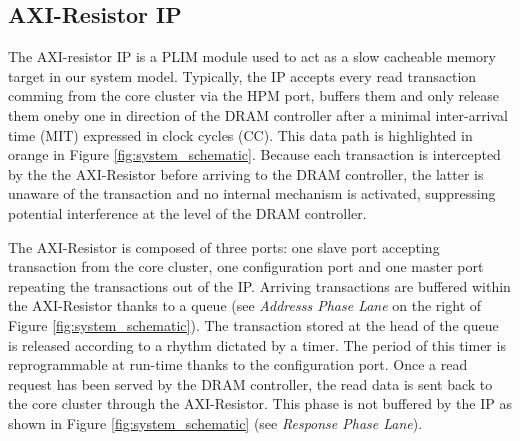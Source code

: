     \subsection{AXI-Resistor IP}
        \label{subsec:axi-resistor}
        The AXI-resistor IP is a PLIM module \cite{PLIM20} used to act as a slow cacheable memory target in our system model.
        Typically, the IP accepts every read transaction comming from the core cluster via the HPM port, buffers them and only release them oneby one in direction of the DRAM controller after a minimal inter-arrival time (MIT) expressed in clock cycles (CC).
        This data path is highlighted in orange in Figure \ref{fig:system_schematic}.
        Because each transaction is intercepted by the the AXI-Resistor before arriving to the DRAM controller, the latter is unaware of the transaction and no internal mechanism is activated, suppressing potential interference at the level of the DRAM controller.

        The AXI-Resistor is composed of three ports: one slave port accepting transaction from the core cluster, one configuration port and one master port repeating the transactions out of the IP.
        Arriving transactions are buffered within the AXI-Resistor thanks to a queue (see \emph{Addresss Phase Lane} on the right of Figure \ref{fig:system_schematic}).
        The transaction stored at the head of the queue is released according to a rhythm dictated by a timer.
        The period of this timer is reprogrammable at run-time thanks to the configuration port.
        Once a read request has been served by the DRAM controller, the read data is sent back to the core cluster through the AXI-Resistor.
        This phase is not buffered by the IP as shown in Figure \ref{fig:system_schematic} (see \emph{Response Phase Lane}).
